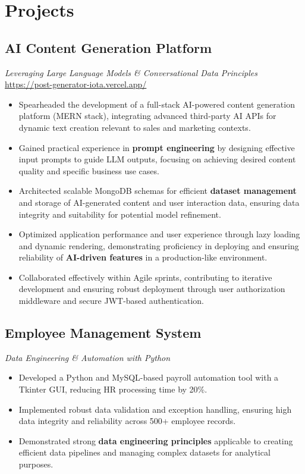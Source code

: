 \documentclass[11pt]{article}
\begin{document}
\section*{Projects}
\subsection*{AI Content Generation Platform}
\textit{Leveraging Large Language Models \& Conversational Data Principles} \hfill \href{https://post-generator-iota.vercel.app/}{https://post-generator-iota.vercel.app/}
\begin{itemize}[leftmargin=*,label=\textbullet]
    \item Spearheaded the development of a full-stack AI-powered content generation platform (MERN stack), integrating advanced third-party AI APIs for dynamic text creation relevant to sales and marketing contexts.
    \item Gained practical experience in \textbf{prompt engineering} by designing effective input prompts to guide LLM outputs, focusing on achieving desired content quality and specific business use cases.
    \item Architected scalable MongoDB schemas for efficient \textbf{dataset management} and storage of AI-generated content and user interaction data, ensuring data integrity and suitability for potential model refinement.
    \item Optimized application performance and user experience through lazy loading and dynamic rendering, demonstrating proficiency in deploying and ensuring reliability of \textbf{AI-driven features} in a production-like environment.
    \item Collaborated effectively within Agile sprints, contributing to iterative development and ensuring robust deployment through user authorization middleware and secure JWT-based authentication.
\end{itemize}

\subsection*{Employee Management System}
\textit{Data Engineering \& Automation with Python}
\begin{itemize}[leftmargin=*,label=\textbullet]
    \item Developed a Python and MySQL-based payroll automation tool with a Tkinter GUI, reducing HR processing time by 20\%.
    \item Implemented robust data validation and exception handling, ensuring high data integrity and reliability across 500+ employee records.
    \item Demonstrated strong \textbf{data engineering principles} applicable to creating efficient data pipelines and managing complex datasets for analytical purposes.
\end{itemize}
\end{document}
